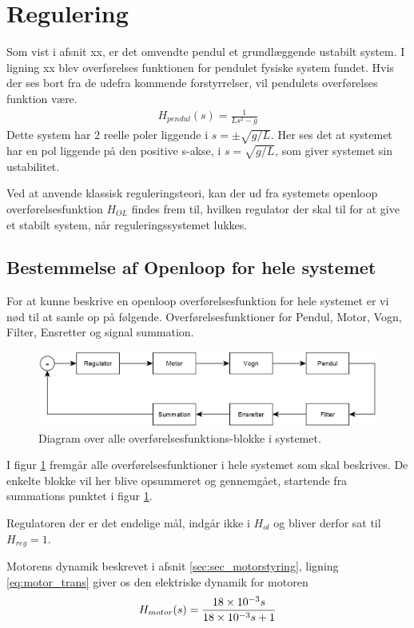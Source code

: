 \section{Regulering}\label{sec:regulering}

Som vist i afsnit xx, er det omvendte pendul et grundlæggende ustabilt system.
I ligning xx blev overførelses funktionen for pendulet fysiske system fundet.
Hvis der ses bort fra de udefra kommende forstyrrelser, vil pendulets overførelses funktion være.
\begin{align}
H_{pendul}(s) = \frac{1}{Ls^2 - g} \label{eq:h_pendul}
\end{align} 
Dette system har 2 reelle poler liggende i $s = \pm\sqrt{g/L}$.
Her ses det at systemet har en pol liggende på den positive s-akse, i $s = \sqrt{g/L}$, som giver systemet sin ustabilitet.

Ved at anvende klassisk reguleringsteori, kan der ud fra systemets openloop overførelsesfunktion $H_{OL}$ findes frem til, hvilken regulator der skal til for at give et stabilt system, når reguleringssystemet lukkes.   

\subsection{Bestemmelse af Openloop for hele systemet}
For at kunne beskrive en openloop overførelsesfunktion for hele systemet er vi nød til at samle op på følgende.
Overførelsesfunktioner for Pendul, Motor, Vogn, Filter, Ensretter og signal summation.
\begin{figure}[h!]
	\centering
	\includegraphics[width=.8\textwidth]{billeder/reg_diagram.png}
	\caption{Diagram over alle overførelsesfunktions-blokke i systemet.}
	\label{fig:reg_diagram}
\end{figure}
\FloatBlock 

I figur \ref{fig:reg_diagram} fremgår alle overførelsesfunktioner i hele systemet som skal beskrives.
De enkelte blokke vil her blive opsummeret og gennemgået, startende fra summations punktet i figur \ref{fig:reg_diagram}.

Regulatoren der er det endelige mål, indgår ikke i $H_{ol}$ og bliver derfor sat til $H_{reg} = 1$.   

Motorens dynamik beskrevet i afsnit \ref{sec:sec_motorstyring}, ligning \ref{eq:motor_trans} giver os den elektriske dynamik for motoren
\begin{align}
H_{motor}(s) = \frac{\num{18E-3}s}{\num{18E-3}s +1}
\end{align}

